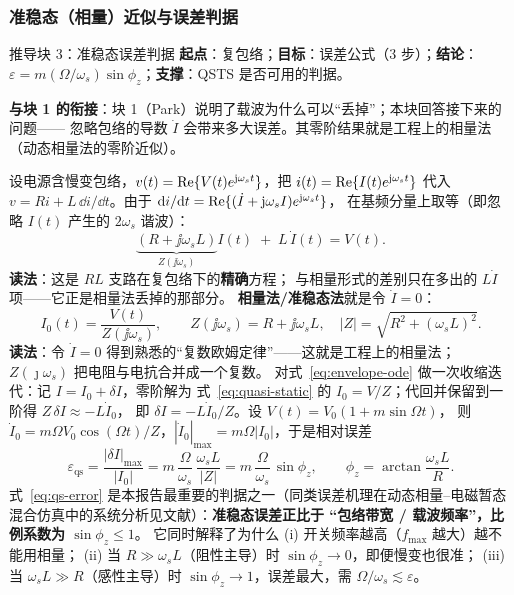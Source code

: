 \subsubsection{准稳态（相量）近似与误差判据}
\begin{derivblock}{推导块 3：准稳态误差判据}
\textbf{起点}：复包络；\textbf{目标}：误差公式（3 步）；\textbf{结论}：$\varepsilon=m(\Omega/\omega_s)\sin\phi_z$；\textbf{支撑}：QSTS 是否可用的判据。

\textbf{与块 1 的衔接}：块 1（Park）说明了载波为什么可以“丢掉”；本块回答接下来的问题——
忽略包络的导数 $\dot I$ 会带来多大误差。其零阶结果就是工程上的相量法（动态相量法的零阶近似\cite{chen2023}）。


\label{sec:quasi}

设电源含慢变包络，$v(t)=\operatorname{Re}\{V(t)e^{\mathrm{j}\omega_s t}\}$，把 $i(t)=\operatorname{Re}\{I(t)e^{\mathrm{j}\omega_s t}\}$
代入 $v=Ri+L\,\dd i/\dd t$。由于 $\mathrm{d} i/\mathrm{d} t=\operatorname{Re}\{(\dot I+\mathrm{j}\omega_s I)e^{\mathrm{j}\omega_s t}\}$，
在基频分量上取等（即忽略 $I(t)$ 产生的 $2\omega_s$ 谐波）：
\begin{equation}
\underbrace{(R+\jj\omega_s L)}_{Z(\jj\omega_s)}I(t)\;+\;L\,\dot I(t)=V(t).
\label{eq:envelope-ode}
\end{equation}
\textbf{读法}：这是 $RL$ 支路在复包络下的\textbf{精确}方程；
与相量形式的差别只在多出的 $L\dot I$ 项——它正是相量法丢掉的那部分。
\textbf{相量法/准稳态法}就是令 $\dot I=0$：
\begin{equation}
I_0(t)=\frac{V(t)}{Z(\jj\omega_s)},\qquad
Z(\jj\omega_s)=R+\jj\omega_s L,\quad |Z|=\sqrt{R^2+(\omega_s L)^2}.
\label{eq:quasi-static}
\end{equation}
\textbf{读法}：令 $\dot I=0$ 得到熟悉的“复数欧姆定律”——这就是工程上的相量法；
$Z(\jmath\omega_s)$ 把电阻与电抗合并成一个复数。
对式~\eqref{eq:envelope-ode} 做一次收缩迭代：记 $I=I_0+\delta I$，零阶解为
式~\eqref{eq:quasi-static} 的 $I_0=V/Z$；代回并保留到一阶得 $Z\,\delta I\approx-L\dot I_0$，
即 $\delta I=-L\dot I_0/Z$。设 $V(t)=V_0(1+m\sin\Omega t)$，
则 $\dot I_0=m\Omega V_0\cos(\Omega t)/Z$，$|\dot I_0|_{\max}=m\Omega|I_0|$，于是相对误差
\begin{equation}
\boxed{\;
\varepsilon_{\text{qs}}
=\frac{|\delta I|_{\max}}{|I_0|}
=m\,\frac{\Omega}{\omega_s}\,\frac{\omega_s L}{|Z|}
=m\,\frac{\Omega}{\omega_s}\,\sin\phi_z ,
\qquad \phi_z=\arctan\frac{\omega_s L}{R} .\;}
\label{eq:qs-error}
\end{equation}
式~\eqref{eq:qs-error} 是本报告最重要的判据之一（同类误差机理在动态相量--电磁暂态混合仿真中的系统分析见文献\cite{chen2023}）：\textbf{准稳态误差正比于
“包络带宽 / 载波频率”，比例系数为 $\sin\phi_z\le1$}。
它同时解释了为什么
(i) 开关频率越高（$f_{\max}$ 越大）越不能用相量；
(ii) 当 $R\gg\omega_s L$（阻性主导）时 $\sin\phi_z\to0$，即便慢变也很准；
(iii) 当 $\omega_s L\gg R$（感性主导）时 $\sin\phi_z\to1$，误差最大，需 $\Omega/\omega_s\lesssim\varepsilon$。

\end{derivblock}

